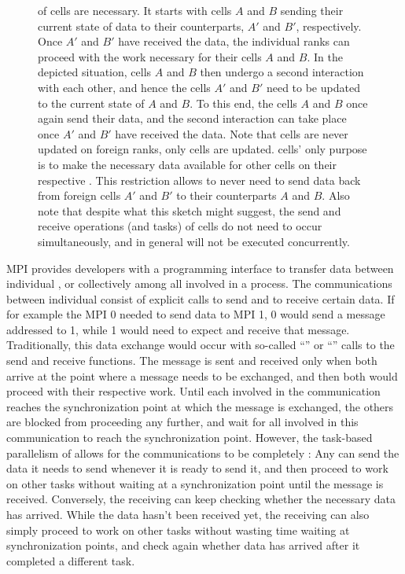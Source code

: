 \begin{figure}
{of
 cells are necessary. It starts with  cells $A$ and $B$ sending their
current state of data to their  counterparts, $A'$ and $B'$, respectively. Once $A'$
and $B'$ have received the data, the individual ranks can proceed with the work necessary for their
 cells $A$ and $B$. In the depicted situation, cells $A$ and $B$ then undergo a
second interaction with each other, and hence the  cells $A'$ and $B'$ need to be
updated to the current state of $A$ and $B$. To this end, the cells $A$ and $B$ once again send
their data, and the second interaction can take place once $A'$ and $B'$ have received the data.
Note that  cells are never updated on foreign ranks, only  cells are
updated.  cells' only purpose is to make the necessary data available for other
 cells on their respective . This restriction allows to never need to send
data back from foreign cells $A'$ and $B'$ to their  counterparts $A$ and $B$. Also
note that despite what this sketch might suggest, the send and receive operations (and tasks) of
cells do not need to occur simultaneously, and in general will not be executed concurrently.
}
 \label{fig:mpi-comm-repeated}
\end{figure}



MPI provides developers with a programming interface to transfer data between individual
, or collectively among all  involved in a process. The communications
between individual  consist of explicit calls to send and to receive certain data. If
for example the MPI  0 needed to send data to MPI  1,  0 would
send a message addressed to  1, while  1 would need to expect and receive
that message. Traditionally, this data exchange would occur with so-called ``'' or
``'' calls to the send and receive functions. The message is sent and received
only when both  arrive at the point where a message needs to be exchanged, and then
both  would proceed with their respective work. Until each  involved in
the communication reaches the synchronization point at which the message is exchanged, the others
are blocked from proceeding any further, and wait for all  involved in this
communication to reach the synchronization point. However, the task-based parallelism of \swift
allows for the communications to be completely : Any  can send the
data it needs to send whenever it is ready to send it, and then proceed to work on other tasks
without waiting at a synchronization point until the message is received. Conversely, the receiving
 can keep checking whether the necessary data has arrived. While the data hasn't been
received yet, the receiving  can also simply proceed to work on other tasks without
wasting time waiting at synchronization points, and check again whether data has arrived after it
completed a different task.


